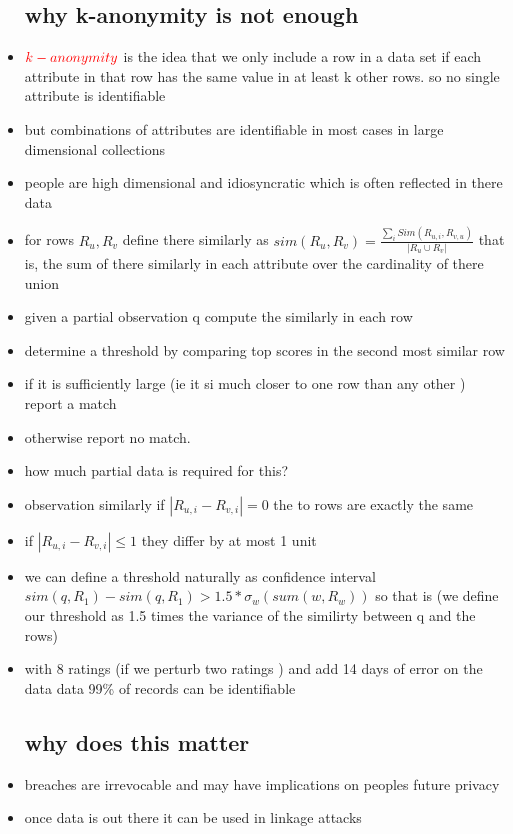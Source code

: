 \documentclass{article}
\begin{document}
\begin{itemize}
\subsection*{why k-anonymity is not enough }
\item $\textcolor{red}{k - anonymity}$ is the idea that we only include a row in a data set if each attribute in that row has the same value in at least k other rows. so no single attribute is identifiable 
\item but combinations of attributes are identifiable in most cases in large dimensional collections 
\item people are high dimensional  and idiosyncratic which is often reflected in there data 
\item for rows $R_u, R_v $ define there similarly as $sim(R_u, R_v)=\frac{\sum_{i}Sim(R_{u,i}, R_{v,u})}{|R_{u}\cup R_{v}|}$  that is, the sum of there similarly in each attribute over the cardinality of there union 
\item given a partial observation q compute the similarly in each row 
\item determine a threshold by comparing top scores in the second most similar row 
\item if it is sufficiently large (ie it si much closer to one row than any other ) report a match 
\item otherwise report no match. 
\item how much partial data is required for this? 
\item observation similarly if $|R_{u,i}-R_{v,i}|=0$ the to rows are exactly the same 
\item if $|R_{u,i}-R_{v,i}|\leq 1$ they differ by at most 1 unit
\item we can define a threshold naturally as confidence interval $sim(q,R_1)-sim(q,R_1)>1.5*\sigma_{w}(sum(w,R_w))$ so that is (we define our threshold as 1.5 times the variance of the similirty between q and the rows)
\item with 8 ratings (if we perturb two ratings ) and add 14 days of error on the data data 99\% of records can be identifiable
\subsection*{why does this matter}
\item breaches are irrevocable and may have implications on peoples future privacy
\item once data is out there it can be used in linkage attacks 

\end{itemize}
\end{document}
